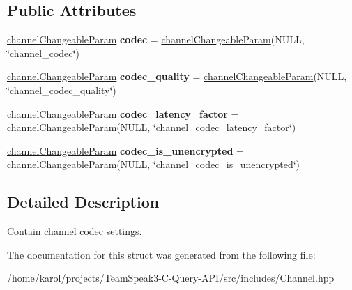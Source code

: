 \subsection*{Public Attributes}
\begin{DoxyCompactItemize}
\item 
\hyperlink{struct_ts3_api_1_1_channel_1_1channel_changeable_param}{channel\+Changeable\+Param} {\bfseries codec} = \hyperlink{struct_ts3_api_1_1_channel_1_1channel_changeable_param}{channel\+Changeable\+Param}(N\+U\+LL, \char`\"{}channel\+\_\+codec\char`\"{})\hypertarget{struct_ts3_api_1_1_channel_1_1channel_codec_ab00b6caa9fa7d81f62d9044eb0d81e39}{}\label{struct_ts3_api_1_1_channel_1_1channel_codec_ab00b6caa9fa7d81f62d9044eb0d81e39}

\item 
\hyperlink{struct_ts3_api_1_1_channel_1_1channel_changeable_param}{channel\+Changeable\+Param} {\bfseries codec\+\_\+quality} = \hyperlink{struct_ts3_api_1_1_channel_1_1channel_changeable_param}{channel\+Changeable\+Param}(N\+U\+LL, \char`\"{}channel\+\_\+codec\+\_\+quality\char`\"{})\hypertarget{struct_ts3_api_1_1_channel_1_1channel_codec_a17025f34997a4e3c066dfdbea686b02d}{}\label{struct_ts3_api_1_1_channel_1_1channel_codec_a17025f34997a4e3c066dfdbea686b02d}

\item 
\hyperlink{struct_ts3_api_1_1_channel_1_1channel_changeable_param}{channel\+Changeable\+Param} {\bfseries codec\+\_\+latency\+\_\+factor} = \hyperlink{struct_ts3_api_1_1_channel_1_1channel_changeable_param}{channel\+Changeable\+Param}(N\+U\+LL, \char`\"{}channel\+\_\+codec\+\_\+latency\+\_\+factor\char`\"{})\hypertarget{struct_ts3_api_1_1_channel_1_1channel_codec_a000ada6b4d5ff3c7c3ad593dd3c14828}{}\label{struct_ts3_api_1_1_channel_1_1channel_codec_a000ada6b4d5ff3c7c3ad593dd3c14828}

\item 
\hyperlink{struct_ts3_api_1_1_channel_1_1channel_changeable_param}{channel\+Changeable\+Param} {\bfseries codec\+\_\+is\+\_\+unencrypted} = \hyperlink{struct_ts3_api_1_1_channel_1_1channel_changeable_param}{channel\+Changeable\+Param}(N\+U\+LL, \char`\"{}channel\+\_\+codec\+\_\+is\+\_\+unencrypted\char`\"{})\hypertarget{struct_ts3_api_1_1_channel_1_1channel_codec_aea7986a0df5f717e4da96dad5768a860}{}\label{struct_ts3_api_1_1_channel_1_1channel_codec_aea7986a0df5f717e4da96dad5768a860}

\end{DoxyCompactItemize}


\subsection{Detailed Description}
Contain channel codec settings. 

The documentation for this struct was generated from the following file\+:\begin{DoxyCompactItemize}
\item 
/home/karol/projects/\+Team\+Speak3-\/\+C-\/\+Query-\/\+A\+P\+I/src/includes/Channel.\+hpp\end{DoxyCompactItemize}
